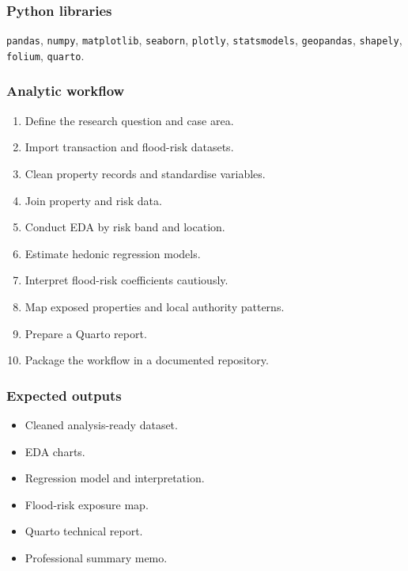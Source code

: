 \documentclass[
  a4paper,
]{article}
\providecommand{\tightlist}{%
  \setlength{\itemsep}{0pt}\setlength{\parskip}{0pt}}
\begin{document}
\subsubsection{Python libraries}\label{python-libraries}

\texttt{pandas}, \texttt{numpy}, \texttt{matplotlib}, \texttt{seaborn},
\texttt{plotly}, \texttt{statsmodels}, \texttt{geopandas},
\texttt{shapely}, \texttt{folium}, \texttt{quarto}.

\subsubsection{Analytic workflow}\label{analytic-workflow}

\begin{enumerate}
\def\labelenumi{\arabic{enumi}.}
\tightlist
\item
  Define the research question and case area.
\item
  Import transaction and flood-risk datasets.
\item
  Clean property records and standardise variables.
\item
  Join property and risk data.
\item
  Conduct EDA by risk band and location.
\item
  Estimate hedonic regression models.
\item
  Interpret flood-risk coefficients cautiously.
\item
  Map exposed properties and local authority patterns.
\item
  Prepare a Quarto report.
\item
  Package the workflow in a documented repository.
\end{enumerate}

\subsubsection{Expected outputs}\label{expected-outputs}

\begin{itemize}
\tightlist
\item
  Cleaned analysis-ready dataset.
\item
  EDA charts.
\item
  Regression model and interpretation.
\item
  Flood-risk exposure map.
\item
  Quarto technical report.
\item
  Professional summary memo.
\end{itemize}
\end{document}
